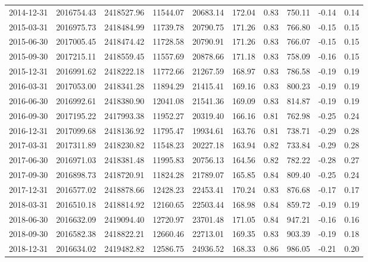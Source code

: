 \begin{landscape}
\begin{longtable}{llllllllll}
2014-12-31 & 2016754.43 & 2418527.96 & 11544.07 & 20683.14 & 172.04 & 0.83         & 750.11   & -0.14    & 0.14     \\
2015-03-31 & 2016975.73 & 2418484.99 & 11739.78 & 20790.75 & 171.26 & 0.83         & 766.80   & -0.15    & 0.15     \\
2015-06-30 & 2017005.45 & 2418474.42 & 11728.58 & 20790.91 & 171.26 & 0.83         & 766.07   & -0.15    & 0.15     \\
2015-09-30 & 2017215.11 & 2418559.45 & 11557.69 & 20878.66 & 171.18 & 0.83         & 758.09   & -0.16    & 0.15     \\
2015-12-31 & 2016991.62 & 2418222.18 & 11772.66 & 21267.59 & 168.97 & 0.83         & 786.58   & -0.19    & 0.19     \\
2016-03-31 & 2017053.00 & 2418341.28 & 11894.29 & 21415.41 & 169.16 & 0.83         & 800.23   & -0.19    & 0.19     \\
2016-06-30 & 2016992.61 & 2418380.90 & 12041.08 & 21541.36 & 169.09 & 0.83         & 814.87   & -0.19    & 0.19     \\
2016-09-30 & 2017195.22 & 2417993.38 & 11952.27 & 20319.40 & 166.16 & 0.81         & 762.98   & -0.25    & 0.24     \\
2016-12-31 & 2017099.68 & 2418136.92 & 11795.47 & 19934.61 & 163.76 & 0.81         & 738.71   & -0.29    & 0.28     \\
2017-03-31 & 2017311.89 & 2418230.82 & 11548.23 & 20227.18 & 163.94 & 0.82         & 733.84   & -0.29    & 0.28     \\
2017-06-30 & 2016971.03 & 2418381.48 & 11995.83 & 20756.13 & 164.56 & 0.82         & 782.22   & -0.28    & 0.27     \\
2017-09-30 & 2016898.73 & 2418720.91 & 11824.28 & 21789.07 & 165.85 & 0.84         & 809.40   & -0.25    & 0.24     \\
2017-12-31 & 2016577.02 & 2418878.66 & 12428.23 & 22453.41 & 170.24 & 0.83         & 876.68   & -0.17    & 0.17     \\
2018-03-31 & 2016510.18 & 2418814.92 & 12160.65 & 22503.44 & 168.98 & 0.84         & 859.72   & -0.19    & 0.19     \\
2018-06-30 & 2016632.09 & 2419094.40 & 12720.97 & 23701.48 & 171.05 & 0.84         & 947.21   & -0.16    & 0.16     \\
2018-09-30 & 2016582.38 & 2418822.21 & 12660.46 & 22713.01 & 169.35 & 0.83         & 903.39   & -0.19    & 0.18     \\
2018-12-31 & 2016634.02 & 2419482.82 & 12586.75 & 24936.52 & 168.33 & 0.86         & 986.05   & -0.21    & 0.20  
\label{tab:Bos_SE} 
\end{longtable}
\end{landscape}


